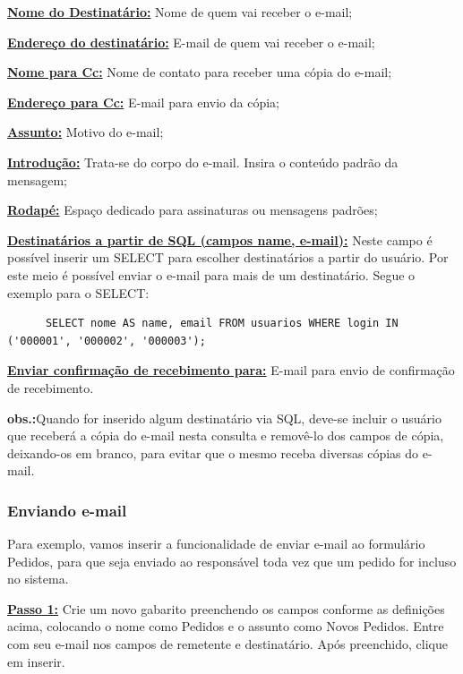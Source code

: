 \documentclass[9pt]{report}
\begin{document}
{      \underline{\textbf{Nome do Destinatário:}} Nome de quem vai
      receber o e-mail;
      
      \underline{\textbf{Endereço do destinatário:}} E-mail de quem
      vai receber o e-mail;
      
      \underline{\textbf{Nome para Cc:}} Nome de contato para receber
      uma cópia do e-mail;
      
      \underline{\textbf{Endereço para Cc:}} E-mail para envio da
      cópia;
      
      \underline{\textbf{Assunto:}} Motivo do e-mail;
      
      \underline{\textbf{Introdução:}} Trata-se do corpo do e-mail.
      Insira o conteúdo padrão da mensagem;
      
      \underline{\textbf{Rodapé:}} Espaço dedicado para assinaturas
      ou mensagens padrões;
      
      \underline{\textbf{Destinatários a partir de SQL (campos name, e-mail):}} Neste campo é possível inserir um SELECT para escolher
      destinatários a partir do usuário. Por este meio é possível
      enviar o e-mail para mais de um destinatário. Segue o exemplo
      para o SELECT:

      \begin{lstlisting}
      SELECT nome AS name, email FROM usuarios WHERE login IN ('000001', '000002', '000003');
      \end{lstlisting}
      
      \underline{\textbf{Enviar confirmação de recebimento para:}}
      E-mail para envio de confirmação de recebimento.

      \textbf{obs.:}Quando for inserido algum destinatário via SQL,
      deve-se incluir o usuário que receberá a cópia do e-mail nesta
      consulta e removê-lo dos campos de cópia, deixando-os em
      branco, para evitar que o mesmo receba diversas cópias do
      e-mail.    
          
      \subsubsection{Enviando e-mail}

      Para exemplo, vamos inserir a funcionalidade de enviar e-mail
      ao formulário Pedidos, para que seja enviado ao responsável
      toda vez que um pedido for incluso no sistema.


      \underline{\textbf{Passo 1:}} Crie um novo gabarito preenchendo
      os campos conforme as definições acima, colocando o nome como
      Pedidos e o assunto como Novos Pedidos. Entre com seu e-mail
      nos campos de remetente e destinatário. Após preenchido, clique
      em inserir.

}
\end{document}
